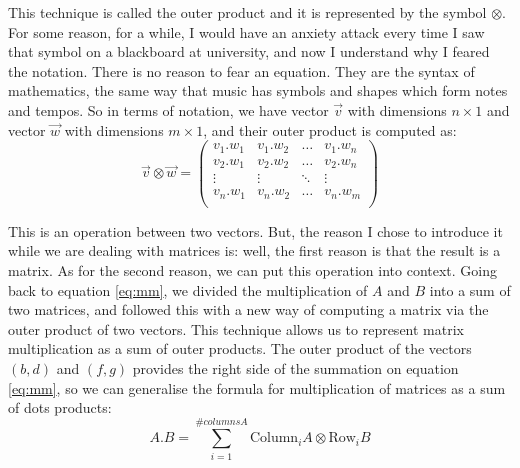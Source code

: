 \documentclass[a4,12pt,twosided,openany]{memoir}
\begin{document}
This technique is called the outer product and it is represented by the symbol $\otimes$. For some reason, for a while, I would have an anxiety attack every time I saw that symbol on a blackboard at university, and now I understand why I feared the notation. There is no reason to fear an equation. They are the syntax of mathematics, the same way that music has symbols and shapes which form notes and tempos. So in terms of notation, we have vector $\overrightarrow{v}$ with dimensions $n \times 1$ and vector $\overrightarrow{w}$ with dimensions $m \times 1$, and their outer product is computed as:
\[
\overrightarrow{v} \otimes \overrightarrow{w} = 
\begin{pmatrix}
v_1.w_1 & v_1.w_2 & \hdots & v_1.w_n \\
v_2.w_1 & v_2.w_2 & \hdots & v_2.w_n \\
\vdots & \vdots & \ddots & \vdots \\
v_n.w_1 & v_n.w_2 & \hdots & v_n.w_m\\
\end{pmatrix}
\]
\par 
\indent
This is an operation between two vectors. But, the reason I chose to introduce it while we are dealing with matrices is: well, the first reason is that the result is a matrix. As for the second reason, we can put this operation into context. Going back to equation \ref{eq:mm}, we divided the multiplication of $A$ and $B$ into a sum of two matrices, and followed this with a new way of computing a matrix via the outer product of two vectors. This technique allows us to represent matrix multiplication as a sum of outer products. The outer product of the vectors $(b,d)$ and $(f,g)$ provides the right side of the summation on equation \ref{eq:mm}, so we can generalise the formula for multiplication of matrices as a sum of dots products:
\[ A.B = \sum_{i=1}^{\#columnsA} \textrm{Column}_i A \otimes \textrm{Row}_i B \]
\end{document}
